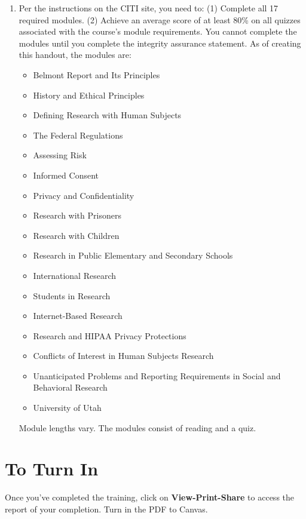 \documentclass{article}
\begin{document}
\begin{enumerate}
    \item Per the instructions on the CITI site, you need to: (1) Complete all 17 required modules. (2) Achieve an average score of at least 80\% on all quizzes associated with the course’s module requirements. You cannot complete the modules until you complete the integrity assurance statement. As of creating this handout, the modules are:
    \begin{itemize}
        \item Belmont Report and Its Principles 
        \item History and Ethical Principles 
        \item Defining Research with Human Subjects 
        \item The Federal Regulations
        \item Assessing Risk
        \item Informed Consent
        \item Privacy and Confidentiality
        \item Research with Prisoners
        \item Research with Children
        \item Research in Public Elementary and Secondary Schools \item International Research
        \item Students in Research
        \item Internet-Based Research
        \item Research and HIPAA Privacy Protections
        \item Conflicts of Interest in Human Subjects Research
        \item Unanticipated Problems and Reporting Requirements in Social and Behavioral Research
        \item University of Utah
    \end{itemize}
    Module lengths vary. The modules consist of reading and a quiz.
\end{enumerate}


\section{To Turn In}
Once you've completed the training, click on \textbf{View-Print-Share} to access the report of your completion. Turn in the PDF to Canvas.
\end{document}
